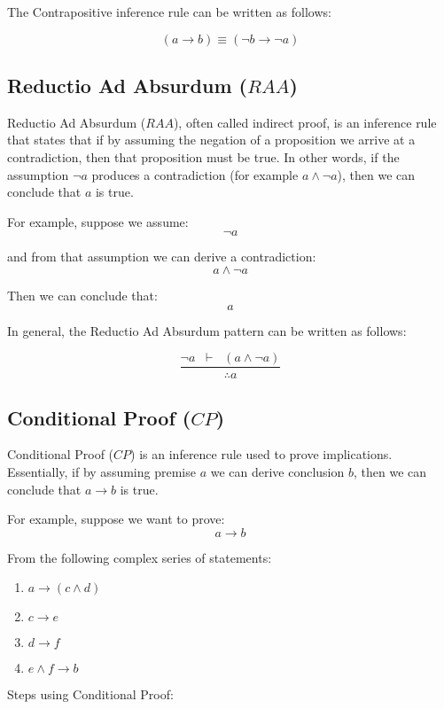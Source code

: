 \documentclass[12pt,a4paper,openany]{article}
\begin{document}
The Contrapositive inference rule can be written as follows:

\[
(a \to b) \equiv (\lnot b \to \lnot a)
\]

\subsection{Reductio Ad Absurdum (\(RAA\))}\label{reductio-ad-absurdum-raa}

Reductio Ad Absurdum (\(RAA\)), often called indirect proof, is an inference rule that states that if by assuming the negation of a proposition we arrive at a contradiction, then that proposition must be true. In other words, if the assumption \(\neg a\) produces a contradiction (for example \(a \land \neg a\)), then we can conclude that \(a\) is true.

For example, suppose we assume:
\[\neg a\]

and from that assumption we can derive a contradiction:
\[a \land \neg a\]

Then we can conclude that:
\[a\]

In general, the Reductio Ad Absurdum pattern can be written as follows:

\[
\frac{\neg a \;\; \vdash \;\; (a \land \neg a)}{\therefore a}
\]

\subsection{Conditional Proof (\(CP\))}\label{conditional-proof-cp}

Conditional Proof (\(CP\)) is an inference rule used to prove implications. Essentially, if by assuming premise \(a\) we can derive conclusion \(b\), then we can conclude that \(a \to b\) is true.

For example, suppose we want to prove:
\[a \to b\]

From the following complex series of statements:

\begin{enumerate}
\item \(a \to (c \land d)\)
\item \(c \to e\)
\item \(d \to f\)
\item \(e \land f \to b\)
\end{enumerate}

Steps using Conditional Proof:
\end{document}
